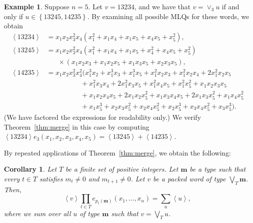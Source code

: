 \documentclass[reqno]{amsart}
\newcommand{\0}{\phantom{c}}
\newcommand{\swt}[1]{\left\langle #1 \right\rangle} %
\newcommand{\merge}[1]{\vee_{#1}} %
\newcommand{\mm}{\mathbf{m}}
\let\sumnonlimits\sum
\let\prodnonlimits\prod
\renewcommand{\sum}{\sumnonlimits\limits}
\renewcommand{\prod}{\prodnonlimits\limits}
\newcommand{\set}[1]{\left\{ #1 \right\}}
\theoremstyle{plain}
\newtheorem{cor}[thm]{Corollary}
\theoremstyle{definition}
\newtheorem{example}[thm]{Example}
\numberwithin{equation}{section}
\begin{document}
\begin{example}
\label{ex:checking_merge_thm}
Suppose $n = 5$.
Let $v = 13234$, and we have that $v = \merge{3} u$ if and only if $u \in \set{13245, 14235}$.
By examining all possible MLQs for these words, we obtain
\begin{align*}
\swt{13234} & = x_1 x_2 x_3^2 x_4 (x_1^2 + x_1 x_4 + x_1 x_5 + x_4 x_5 + x_5^2),
\\ \swt{13245} & = x_1 x_2 x_3^2 x_4 (x_1^2 + x_1x_4 + x_1x_5 + x_4^2 + x_4x_5 + x_5^2)
\\ & \hspace{20pt} \times (x_1x_2x_3 + x_1x_2x_5+x_1x_3x_5+x_2x_3x_5),
\\ \swt{14235} & = x_1x_2x_3^2x_4^2 (x_1^3x_2 + x_1^3x_3 + x_1^3x_5 + x_1^2x_2x_3 + x_1^2x_2x_4 + 2x_1^2x_2x_5
\\ & \hspace{60pt} + x_1^2x_3x_4 + 2x_1^2x_3x_5 + x_1^2x_4x_5 + x_1^2x_5^2 + x_1x_2x_3x_5
\\ & \hspace{60pt} + x_1x_2x_4x_5 + 2x_1x_2x_5^2 + x_1x_3x_4x_5 + 2x_1x_3x_5^2 + x_1x_4x_5^2
\\ & \hspace{60pt} + x_1x_5^3 + x_2x_3x_5^2 + x_2x_4x_5^2 + x_2x_5^3 + x_3x_4x_5^2 + x_3x_5^3).
\end{align*}
(We have factored the expressions for readability only.)
We verify Theorem~\ref{thm:merge} in this case by computing $\swt{13234} e_3(x_1, x_2, x_3, x_4, x_5) = \swt{13245} + \swt{14235}$.
\end{example}

By repeated applications of Theorem~\ref{thm:merge}, we obtain the following:

\begin{cor}
\label{cor:merges}
  Let $T$ be a finite set of positive integers.
  Let $\mm$ be a type such that every $t \in T$ satisfies
  $m_t \neq 0$ and $m_{t+1} \neq 0$.
  Let $v$ be a packed word of type $\bigvee_T \mm$.
  Then,
  \[
  \swt{v} \prod_{t \in T} e_{p_t(\mm)}(x_1, \dotsc, x_n) = \sum_u \swt{u},
  \]
where we sum over all $u$ of type $\mm$ such that $v = \bigvee_T u$.
\end{cor}
\end{document}
